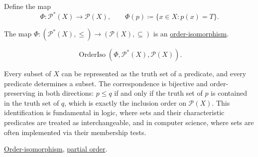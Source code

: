 Define the map
\[
\Phi : \mathcal{P}^*(X) \to \mathcal{P}(X),
\qquad
\Phi(p) \coloneqq \{x \in X : p(x) = T\}.
\]

\begin{proposition}
\label{prop:predicates-power-sets-iso}
The map $\Phi : (\mathcal{P}^*(X), \leq) \to (\mathcal{P}(X), \subseteq)$
is an \hyperref[def:order-isomorphism]{order-isomorphism}.
\end{proposition}

\begin{remark*}
\[
\operatorname{OrderIso}(\Phi, \mathcal{P}^*(X), \mathcal{P}(X)).
\]
\end{remark*}

\begin{remark*}[Interpretation]
Every subset of $X$ can be represented as the truth set of a predicate,
and every predicate determines a subset.  The correspondence is bijective
and order-preserving in both directions: $p \leq q$ if and only if the
truth set of $p$ is contained in the truth set of $q$, which is exactly
the inclusion order on $\mathcal{P}(X)$.  This identification is
fundamental in logic, where sets and their characteristic predicates are
treated as interchangeable, and in computer science, where sets are
often implemented via their membership tests.
\end{remark*}

\begin{remark*}[Dependencies]
\hyperref[def:order-isomorphism]{Order-isomorphism},
\hyperref[def:lattice-order-partial-order]{partial order}.
\end{remark*}
